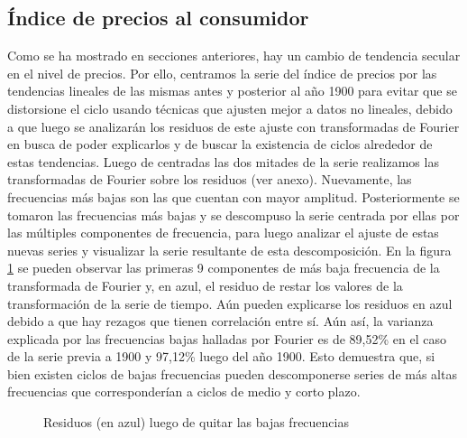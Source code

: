 \documentclass[a4paper]{article}
\begin{document}
\subsection{Índice de precios al consumidor}
Como se ha mostrado en secciones anteriores, hay un cambio de tendencia secular en el nivel de precios. Por ello, centramos la serie del índice de precios por las tendencias lineales de las mismas antes y posterior al año 1900 para evitar que se distorsione el ciclo usando técnicas que ajusten mejor a datos no lineales, debido a que luego se analizarán los residuos de este ajuste con transformadas de Fourier en busca de poder explicarlos y de buscar la existencia de ciclos alrededor de estas tendencias.
Luego de centradas las dos mitades de la serie realizamos las transformadas de Fourier sobre los residuos (ver anexo). Nuevamente, las frecuencias más bajas son las que cuentan con mayor amplitud. Posteriormente se tomaron las frecuencias más bajas y se descompuso la serie centrada por ellas por las múltiples componentes de frecuencia, para luego analizar el ajuste de estas nuevas series y visualizar la serie resultante de esta descomposición. En la figura \ref{fig:cpi_cntr_antifft} se pueden observar las primeras 9 componentes de más baja frecuencia de la transformada de Fourier y, en azul, el residuo de restar los valores de la transformación de la serie de tiempo. Aún pueden explicarse los residuos en azul debido a que hay rezagos que tienen correlación entre sí. Aún así, la varianza explicada por las frecuencias bajas halladas por Fourier es de 89,52\% en el caso de la serie previa a 1900 y 97,12\% luego del año 1900. Esto demuestra que, si bien existen ciclos de bajas frecuencias pueden descomponerse series de más altas frecuencias que corresponderían a ciclos de medio y corto plazo.

\begin{figure}[H]
	\centering
	\caption{Residuos (en azul) luego de quitar las bajas frecuencias} 	
	\label{fig:cpi_cntr_antifft}
\end{figure}
\end{document}
